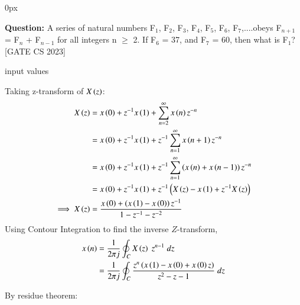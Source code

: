 \documentclass[journal,12pt,onecolumn]{IEEEtran}
\begin{document}
	\parindent 0px
	
	

	
	\title{}
	\author{EE23BTECH11209 - K S Ballvardhan$^{*}$
	}
	\maketitle
	\bigskip
	
	
	
	
	
	\textbf{Question:} A series of natural numbers F$_1$, F$_2$, F$_3$, F$_4$, F$_5$, F$_6$, F$_7$,....obeys F$_{n+1}$ = F$_n$ + F$_{n-1}$ for all integers n $\geq$ 2.
	If F$_6$ = 37, and F$_7$ = 60, then what is F$_1$? \hfill[GATE CS 2023]
	
	\solution
        \fi
	
	\begin{table}[ht] 
		\centering
		
		\caption{input values}
		\label{tab: Table2023cs3}
	\end{table}
	
    Taking z-transform of $X\left(z\right)$:
	\begin{align}
		X\left(z\right) &= x\left(0\right) + z^{-1} x\left(1\right) + \sum_{n=2}^{\infty} x\left(n\right) z^{-n}\\
	    &= x\left(0\right) + z^{-1} x\left(1\right) + z^{-1} \sum_{n=1}^{\infty} x\left(n+1\right) z^{-n}\\
	    &= x\left(0\right) + z^{-1} x\left(1\right) + z^{-1} \sum_{n=1}^{\infty} \left(x\left(n\right) + x\left(n-1\right)\right)z^{-n} \\
	    &= x\left(0\right) + z^{-1} x\left(1\right) + z^{-1}\left(X\left(z\right)-x\left(1\right) + z^{-1}X\left(z\right)\right) \\
		\implies X\left(z\right)&= \frac{x\left(0\right) + \left(x\left(1\right)-x\left(0\right)\right)z^{-1}}{1-z^{-1}-z^{-2}}
	\end{align}
	Using Contour Integration to find the inverse $Z$-transform,
	\begin{align}
		x\left(n\right) &=\frac{1}{2\pi j}\oint_{C} X\left(z\right) \;z^{n-1} \;dz  \\
		&=\frac{1}{2\pi j}\oint_{C}\frac{z^{n}\left(x\left(1\right)-x\left(0\right)+x\left(0\right) z\right)}{z^2-z-1} \;dz 
	\end{align}
	
	By residue theorem:
	
\end{document}
